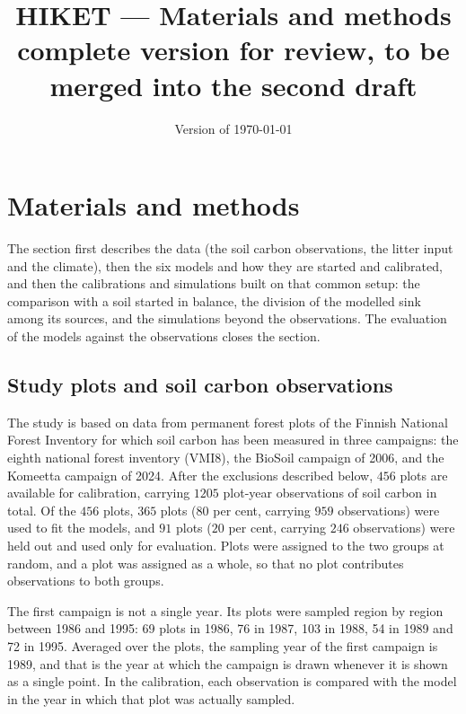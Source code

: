 \documentclass[11pt]{article}
\title{\vspace{-1.2cm}HIKET --- Materials and methods\\[2pt]
\large complete version for review, to be merged into the second draft}
\author{}
\date{Version of \today}
\begin{document}
\maketitle

\section{Materials and methods}

The section first describes the data (the soil carbon observations, the litter input and
the climate), then the six models and how they are started and calibrated, and then the
calibrations and simulations built on that common setup: the comparison with a soil
started in balance, the division of the modelled sink among its sources, and the
simulations beyond the observations. The evaluation of the models against the
observations closes the section.

\subsection{Study plots and soil carbon observations}\label{sec:plots}

The study is based on data from permanent forest plots of the Finnish National Forest
Inventory for which soil carbon has been measured in three campaigns: the eighth national
forest inventory (VMI8), the BioSoil campaign of 2006, and the Komeetta campaign of 2024.
After the exclusions described below, $456$ plots are available for calibration, carrying
$1205$ plot-year observations of soil carbon in total. Of the $456$ plots, $365$ plots
($80$ per cent, carrying $959$ observations) were used to fit the models, and $91$ plots
($20$ per cent, carrying $246$ observations) were held out and used only for evaluation.
Plots were assigned to the two groups at random, and a plot was assigned as a whole, so
that no plot contributes observations to both groups.

The first campaign is not a single year. Its plots were sampled region by region between
1986 and 1995: 69 plots in 1986, 76 in 1987, 103 in 1988, 54 in 1989 and 72 in 1995.
Averaged over the plots, the sampling year of the first campaign is 1989, and that is the
year at which the campaign is drawn whenever it is shown as a single point. In the
calibration, each observation is compared with the model in the year in which that plot
was actually sampled.
\end{document}
